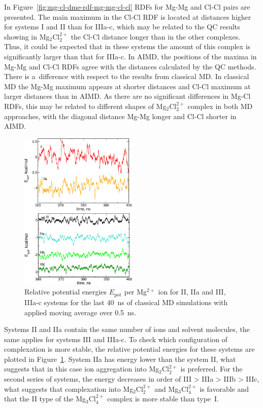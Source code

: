 In Figure~\ref{fig:mg-cl-dme-rdf-mg-mg-cl-cl} RDFs for Mg-Mg and Cl-Cl pairs are presented. The main maximum in the Cl-Cl RDF is located at distances higher for systems I and II than for IIIa-c, which may be related to the QC results showing in Mg$_2$Cl$_2^{2+}$ the Cl-Cl distance longer than in the other complexes. Thus, it could be expected that in these systems the amount of this complex is significantly larger than that for IIIa-c. In AIMD, the positions of the maxima in Mg-Mg and Cl-Cl RDFs agree with the distances calculated by the QC methods. There is a~difference with respect to the results from classical MD. In classical MD the Mg-Mg maximum appears at shorter distances and Cl-Cl maximum at larger distances than in AIMD. As there are no significant differences in Mg-Cl RDFs, this may be related to different shapes of Mg$_2$Cl$_2^{2+}$ complex in both MD approaches, with the diagonal distance Mg-Mg longer and Cl-Cl shorter in AIMD.

\begin{figure}[ht]
    \centering
    \includegraphics[width=0.5\textwidth]{img/3-structural-data-from-md-simulations/3-mg-cl-dme/energies.png}
    \caption{Relative potential energies $E_{\text{pot}}$ per Mg$^{2+}$ ion for II, IIa and III, IIIa-c systems for the last 40~ns of classical MD simulations with applied moving average over 0.5~ns.}
    \label{fig:mg-cl-dme-energies}
\end{figure}

Systems II and IIa contain the same number of ions and solvent molecules, the same applies for systems III and IIIa-c. To check which configuration of complexation is more stable, the relative potential energies for these systems are plotted in Figure~\ref{fig:mg-cl-dme-energies}. System IIa has energy lower than the system II, what suggests that in this case ion aggregation into Mg$_2$Cl$_2^{2+}$ is preferred. For the second series of systems, the energy decreases in order of III > IIIa > IIIb > IIIc, what suggests that complexation into Mg$_2$Cl$_2^{2+}$ and Mg$_3$Cl$_4^{2+}$ is favorable and that the II type of the Mg$_3$Cl$_4^{2+}$ complex is more stable than type~I.

